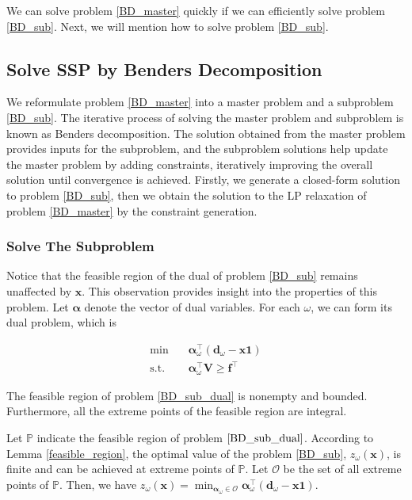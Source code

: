 We can solve problem \eqref{BD_master} quickly if we can efficiently solve problem \eqref{BD_sub}. Next, we will mention how to solve problem \eqref{BD_sub}.

\subsection{Solve SSP by Benders Decomposition}\label{solve_by_benders}
We reformulate problem \eqref{BD_master} into a master problem and a subproblem \eqref{BD_sub}. The iterative process of solving the master problem and subproblem is known as Benders decomposition. 
The solution obtained from the master problem provides inputs for the subproblem, and the subproblem solutions help update the master problem by adding constraints, iteratively improving the overall solution until convergence is achieved. Firstly, we generate a closed-form solution to problem \eqref{BD_sub}, then we obtain the solution to the LP relaxation of problem \eqref{BD_master} by the constraint generation.

\subsubsection{Solve The Subproblem}\label{second_stage}

Notice that the feasible region of the dual of problem \eqref{BD_sub} remains unaffected by $\mathbf{x}$. This observation provides insight into the properties of this problem. Let $\bm{\alpha}$ denote the vector of dual variables. For each $\omega$, we can form its dual problem, which is 

\begin{equation}\label{BD_sub_dual}
  \begin{aligned}
    \min \quad & \bm{\alpha}_{\omega}^{\intercal} (\mathbf{d}_{\omega}- \mathbf{x} \mathbf{1}) \\
    \text {s.t.} \quad & \bm{\alpha}_{\omega}^{\intercal} \mathbf{V} \geq \mathbf{f}^{\intercal}
  \end{aligned}
\end{equation}

\begin{lem}\label{feasible_region}
 The feasible region of problem \eqref{BD_sub_dual} is nonempty and bounded. Furthermore, all the extreme points of the feasible region are integral.
\end{lem}

Let $\mathbb{P}$ indicate the feasible region of problem $\eqref{BD_sub_dual}$. According to Lemma \ref{feasible_region}, the optimal value of the problem \eqref{BD_sub}, $z_{\omega}(\mathbf{x})$, is finite and can be achieved at extreme points of $\mathbb{P}$. Let $\mathcal{O}$ be the set of all extreme points of $\mathbb{P}$. Then, we have $z_{\omega}(\mathbf{x}) = \min_{\bm{\alpha}_{\omega} \in \mathcal{O}} \bm{\alpha}_{\omega}^{\intercal}(\mathbf{d}_{\omega}- \mathbf{x} \mathbf{1})$.


